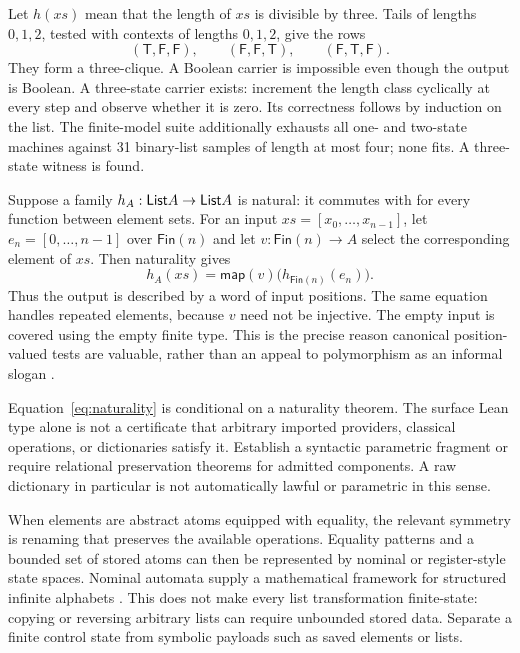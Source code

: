 \begin{example}\label{ex:three}
Let $h(xs)$ mean that the length of $xs$ is divisible by three. Tails of lengths
$0,1,2$, tested with contexts of lengths $0,1,2$, give the rows
\[
 (\mathsf{T},\mathsf{F},\mathsf{F}),\qquad
 (\mathsf{F},\mathsf{F},\mathsf{T}),\qquad
 (\mathsf{F},\mathsf{T},\mathsf{F}).
\]
They form a three-clique. A Boolean carrier is impossible even though the
output is Boolean. A three-state carrier exists: increment the length class
cyclically at every step and observe whether it is zero. Its correctness
follows by induction on the list. The finite-model suite additionally
exhausts all one- and two-state machines against 31 binary-list samples of
length at most four; none fits. A three-state witness is found.
\end{example}


Suppose a family $h_A:\mathsf{List} A\to\mathsf{List} A$ is natural: it commutes with
 for every function between element sets. For an input
$xs=[x_0,\ldots,x_{n-1}]$, let $e_n=[0,\ldots,n-1]$ over $\mathsf{Fin}(n)$
and let $v:\mathsf{Fin}(n)\to A$ select the corresponding element of $xs$.
Then naturality gives
\[
 h_A(xs)=\mathsf{map}(v)\bigl(h_{\mathsf{Fin}(n)}(e_n)\bigr).
 \tag{4}\label{eq:naturality}
\]
Thus the output is described by a word of input positions. The same equation
handles repeated elements, because $v$ need not be injective. The empty input
is covered using the empty finite type. This is the precise reason canonical
position-valued tests are valuable, rather than an appeal to polymorphism as
an informal slogan \cite{parametric}.

Equation~\eqref{eq:naturality} is conditional on a naturality theorem. The
surface Lean type alone is not a certificate that arbitrary imported providers,
classical operations, or dictionaries satisfy it. Establish a syntactic
parametric fragment or require relational preservation theorems for admitted
components. A raw  dictionary in particular is not automatically
lawful or parametric in this sense.

When elements are abstract atoms equipped with equality, the relevant
symmetry is renaming that preserves the available operations. Equality
patterns and a bounded set of stored atoms can then be represented by nominal
or register-style state spaces. Nominal automata supply a mathematical
framework for structured infinite alphabets \cite{nominal}. This does not
make every list transformation finite-state: copying or reversing arbitrary
lists can require unbounded stored data. Separate a finite control state
from symbolic payloads such as saved elements or lists.

